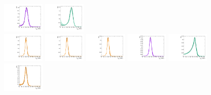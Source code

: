\begin{figure}[htbp]
  \includegraphics[width=0.18\textwidth]{fig/analysis/templateSignalVsMX_fromDC_WprToWZ_MJJ_mu_LP_bb_DEtaLo.pdf}
  \includegraphics[width=0.18\textwidth]{fig/analysis/templateSignalVsMX_fromDC_WprToWH_MJJ_mu_LP_bb_DEtaLo.pdf}\\
  \includegraphics[width=0.18\textwidth]{fig/analysis/templateSignalVsMX_fromDC_GbuToWW_MJJ_mu_HP_nobb_DEtaLo.pdf}
  \includegraphics[width=0.18\textwidth]{fig/analysis/templateSignalVsMX_fromDC_RadToWW_MJJ_mu_HP_nobb_DEtaLo.pdf}
  \includegraphics[width=0.18\textwidth]{fig/analysis/templateSignalVsMX_fromDC_ZprToWW_MJJ_mu_HP_nobb_DEtaLo.pdf}
  \includegraphics[width=0.18\textwidth]{fig/analysis/templateSignalVsMX_fromDC_WprToWZ_MJJ_mu_HP_nobb_DEtaLo.pdf}
  \includegraphics[width=0.18\textwidth]{fig/analysis/templateSignalVsMX_fromDC_WprToWH_MJJ_mu_HP_nobb_DEtaLo.pdf}\\
  \includegraphics[width=0.18\textwidth]{fig/analysis/templateSignalVsMX_fromDC_GbuToWW_MJJ_mu_LP_nobb_DEtaLo.pdf}

\end{figure}
